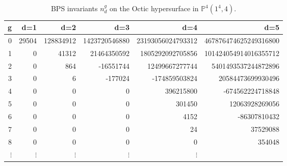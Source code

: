 \documentclass[12pt]{article}
\begin{document}
\begin{table}
\begin{centering}
\begin{tabular}{|r|rrrrr|}
\hline
g &d=1 &d=2 &d=3 &d=4 &d=5  \\
\hline
0& 29504& 128834912&   1423720546880& 23193056024793312&467876474625249316800 \\
1& 0   &      41312&     21464350592&  1805292092705856&101424054914016355712 \\
2& 0   &        864&       -16551744&    12499667277744&  5401493537244872896 \\
3& 0   &          6&         -177024&     -174859503824&    20584473699930496 \\
4& 0   &          0&               0&         396215800&     -674562224718848 \\
5& 0   &          0&               0&            301450&       12063928269056 \\
6& 0   &          0&               0&              4152&         -86307810432 \\
7& 0   &          0&               0&                24&             37529088 \\
8& 0   &          0&               0&                 0&               354048 \\
$\vdots$&$\vdots$&$\vdots$&$\vdots$& $\vdots$& \\
\hline
\end{tabular}
\caption{BPS invariants $n^g_d$ on the Octic hypersurface in $\mathbb{P}^4(1^4,4)$.}
\end{centering}
\end{table}
\end{document}
